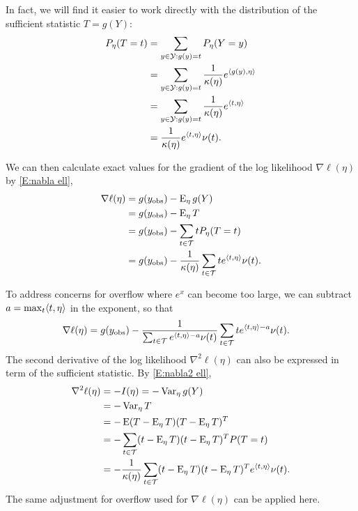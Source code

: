 In fact, we will find it easier to work directly with the distribution of the sufficient
statistic $T=g(Y)$:
\begin{align*}
	P_\eta(T=t) 	&= \sum_{y \in {\mathcal Y}: g(y) = t} P_\eta(Y= y ) \\
		 		&= \sum_{y \in {\mathcal Y}: g(y) = t} \frac{1}{\kappa(\eta)} e^{\langle g(y),\eta \rangle } \\
				&= \sum_{y \in {\mathcal Y}: g(y) = t} \frac{1}{\kappa(\eta)} e^{\langle t,\eta \rangle } \\
				&= \frac{1}{\kappa(\eta)} e^{\langle t,\eta \rangle } \nu(t).
\end{align*}

We can then calculate exact values for the gradient of the log likelihood $\nabla \ell(\eta)$ by \eqref{E:nabla ell},
\begin{align*}
	\nabla \ell (\eta) &= g(y_{\text{obs}}) - \operatorname{E}_\eta g(Y)\\ 
					  &= g(y_{\text{obs}}) - \operatorname{E}_\eta T \\
					  &= g(y_{\text{obs}}) - \sum_{t \in {\mathcal T}} t P_\eta(T = t) \\
					  &= g(y_{\text{obs}}) - \frac{1}{\kappa(\eta)}  \sum_{t \in {\mathcal T}} t e^{\langle t,\eta \rangle } \nu(t).
\end{align*}

To address concerns for overflow where $e^x$ can become too large, we 
can subtract $a = \max_t \langle t, \eta \rangle$ in the exponent, so that
\begin{align*}
	\nabla \ell (\eta) &= g(y_{\text{obs}}) - \frac{1}{\sum_{t \in {\mathcal T}} e^{\langle t,\eta \rangle-a} \nu(t)}  \sum_{t \in {\mathcal T}} t e^{\langle t,\eta \rangle-a} \nu(t).
\end{align*}
The second derivative of the log likelihood $\nabla ^2 \ell(\eta)$ can also be 
expressed in term of the sufficient statistic.  By \eqref{E:nabla2 ell},
\begin{align*}
	\nabla ^2 \ell(\eta) &= - I(\eta) = -\operatorname{Var}_\eta g(Y) \\
	&= -\operatorname{Var}_\eta T \\ 
	&= - \operatorname{E} (T - \operatorname{E}_\eta T)( T - \operatorname{E}_\eta T)^T \\
				&= - \sum_{t \in {\mathcal T}} (t - \operatorname{E}_\eta T)(t - \operatorname{E}_\eta T)^T P(T=t)\\
				&= - \frac{1}{\kappa(\eta)} \sum_{t\in {\mathcal T}}
					(t - \operatorname{E}_\eta T)(t - \operatorname{E}_\eta T)^T e^{\langle t,\eta \rangle} \nu(t).
\end{align*}
The same adjustment for overflow used for $\nabla \ell(\eta)$ can be applied here.

